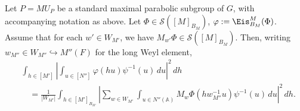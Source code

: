 \begin{lemma}\label{lem:sub-gln:let-p-=}
  Let $P = M {U_P}$ be a standard maximal parabolic subgroup of $G$, with accompanying notation as above.  Let $\Phi \in \mathcal{S}([M]_{B_M})$, $\varphi := \Eis_{B_M}^{M}(\Phi)$.  Assume that for each $w' \in W_{M'}$, we have $M_{w'} \Phi \in \mathcal{S}([M]_{B_M})$.  Then, writing $w_{M''} \in W_{M''} \hookrightarrow M''(F)$ for the long Weyl element,
  \begin{align*}
    &\int_{h \in [M']}
      \left\lvert \int_{u \in [N'']}
      \varphi(h u) \psi^{-1}(u) \, d u
      \right\rvert^2
      \, d h \\
    &\quad =
      \frac{1}{|W_{M'}|}
      \int_{h \in [M']_{B_{M'}}}
      \left\lvert
      \sum_{w \in W_{M'}}
      \int_{u \in N''(\mathbb{A})}
      M_w \Phi (h w_{M''}^{-1} u)
      \psi^{-1}(u) \, d u
      \right\rvert^2
      \, d h.
  \end{align*}
\end{lemma}
